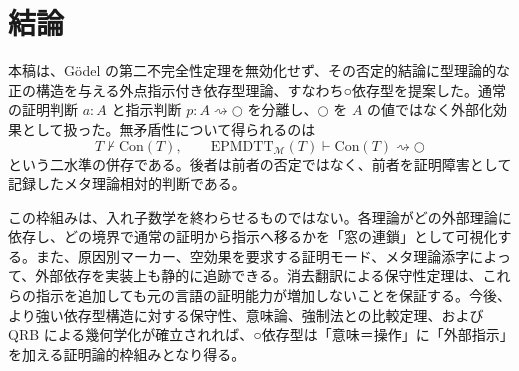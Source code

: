 \documentclass[a4paper,11pt]{ltjsarticle}
\theoremstyle{definition}
\theoremstyle{plain}
\newcommand{\dfix}{\bigcirc}
\newcommand{\EPMDTT}{\mathrm{EPMDTT}}
\newcommand{\Con}{\mathrm{Con}}
\newcommand{\Meta}{\mathcal{M}}
\begin{document}
\section{結論}

本稿は、Gödel の第二不完全性定理を無効化せず、その否定的結論に型理論的な正の構造を与える外点指示付き依存型理論、すなわち○依存型を提案した。通常の証明判断 $a:A$ と指示判断 $p:A\rightsquigarrow\dfix$ を分離し、$\dfix$ を $A$ の値ではなく外部化効果として扱った。無矛盾性について得られるのは
\[
 T\nvdash\Con(T),
 \qquad
 \EPMDTT_{\Meta}(T)\vdash\Con(T)\rightsquigarrow\dfix
\]
という二水準の併存である。後者は前者の否定ではなく、前者を証明障害として記録したメタ理論相対的判断である。

この枠組みは、入れ子数学を終わらせるものではない。各理論がどの外部理論に依存し、どの境界で通常の証明から指示へ移るかを「窓の連鎖」として可視化する。また、原因別マーカー、空効果を要求する証明モード、メタ理論添字によって、外部依存を実装上も静的に追跡できる。消去翻訳による保守性定理は、これらの指示を追加しても元の言語の証明能力が増加しないことを保証する。今後、より強い依存型構造に対する保守性、意味論、強制法との比較定理、および QRB による幾何学化が確立されれば、○依存型は「意味＝操作」に「外部指示」を加える証明論的枠組みとなり得る。



\end{document}

